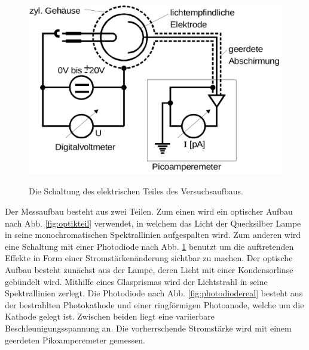 \begin{figure}
	\centering
	\caption{Die Schaltung des elektrischen Teiles des Versuchsaufbaus.}
	\includegraphics[width=\linewidth-150pt,height=\textheight-150pt,keepaspectratio]{content/Bilder/Elektrikteil.png}
	\label{fig:elektrikteil}
\end{figure}





Der Messaufbau besteht aus zwei Teilen. Zum einen wird ein optischer Aufbau nach Abb. \ref{fig:optikteil} verwendet,
in welchem das Licht der Quecksilber Lampe in seine monochromatischen Spektrallinien
aufgespalten wird. Zum anderen wird eine Schaltung mit einer Photodiode nach Abb. \ref{fig:elektrikteil} benutzt um die auftretenden
Effekte in Form einer Stromstärkenänderung sichtbar zu machen. Der optische Aufbau
besteht zunächst aus der Lampe, deren Licht mit einer Kondensorlinse gebündelt wird.
 Mithilfe eines Glasprismas wird der Lichtstrahl in seine Spektrallinien zerlegt.
  Die Photodiode nach Abb. \ref{fig:photodiodereal} besteht aus der bestrahlten
 Photokathode und einer ringförmigen Photoanode, welche um die Kathode gelegt ist.
 Zwischen beiden liegt eine variierbare Beschleunigungsspannung an. Die vorherrschende
 Stromstärke wird mit einem geerdeten Pikoamperemeter gemessen.
